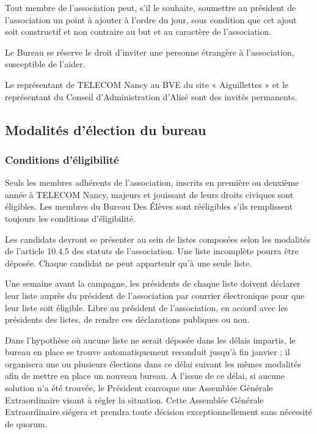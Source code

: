 \documentclass{article} %
\begin{document}
				Tout membre de l’association peut, s’il le souhaite, soumettre
				au président de l’association un point à ajouter à l’ordre du
				jour, sous condition que cet ajout soit constructif et non
				contraire au but et au caractère de l’association.

				Le Bureau se réserve le droit d’inviter une personne étrangère à
				l’association, susceptible de l’aider. 

				Le représentant de TELECOM Nancy au BVE du site « Aiguillettes »
				et le représentant du Conseil d’Administration d’Alisé sont des
				invités permanents.

		\subsection{Modalités d’élection du bureau}

			\subsubsection{Conditions d’éligibilité}
					
				Seuls les membres adhérents de l'association, inscrits en
				première ou deuxième année à TELECOM Nancy, majeurs et jouissant
				de leurs droits civiques sont éligibles. Les membres du Bureau
				Des Élèves sont rééligibles s’ils remplissent toujours les
				conditions d’éligibilité.

				Les candidats devront se présenter au sein de listes composées
				selon les modalités de l’article 10.4.5 des
				statuts de l’association. Une
				liste incomplète pourra être déposée. Chaque candidat ne peut
				appartenir qu’à une seule liste.

				Une semaine avant la campagne, les présidents de chaque liste
				doivent déclarer leur liste auprès du président de l’association
				par courrier électronique pour que leur liste soit éligible.
				Libre au président de l’association, en accord avec les
				présidents des listes, de rendre ces déclarations publiques ou
				non.

				Dans l’hypothèse où aucune liste ne serait déposée dans les
				délais impartis, le bureau en place se trouve automatiquement
				reconduit jusqu’à fin janvier ; il organisera une ou plusieurs
				élections dans ce délai suivant les mêmes modalités afin de
				mettre en place un nouveau bureau. A l’issue de ce délai, si
				aucune solution n’a été trouvée, le Président convoque une
				Assemblée Générale Extraordinaire visant à régler la situation.
				Cette Assemblée Générale Extraordinaire siégera et prendra toute
				décision exceptionnellement sans nécessité de quorum.
\end{document}
